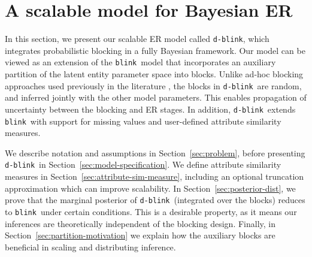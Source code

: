 \documentclass[12pt,letterpaper]{article}
\newcommand{\1}[1]{\mathbb{I}\!\left[#1\right]} %
\newcommand{\dblink}{\texttt{\upshape \lowercase{d-blink}}} %
\newcommand{\blink}{\texttt{\upshape \lowercase{blink}}} %
\begin{document}
\section{A scalable model for Bayesian ER}
\label{sec:model}

In this section, we present our scalable ER model called \dblink, 
which integrates probabilistic blocking in a fully Bayesian framework.
Our model can be viewed as an extension of the \blink\ model 
\citep{steorts_entity_2015} that incorporates an auxiliary partition 
of the latent entity parameter space into blocks. 
Unlike ad-hoc blocking approaches used previously in the literature 
\citep{larsen_advances_2005, larsen_experiment_2012, 
  tancredi_hierarchical_2011, gutman_bayesian_2013, sadinle_detecting_2014, 
  steorts_bayesian_2016}, 
the blocks in \dblink\ are random, and inferred jointly with the other 
model parameters. 
This enables propagation of uncertainty between the blocking and ER stages.
In addition, \dblink\ extends \blink\ with support for missing values and 
user-defined attribute similarity measures.

We describe notation and assumptions in Section~\ref{sec:problem}, before 
presenting \dblink\ in Section~\ref{sec:model-specification}.
We define attribute similarity measures in 
Section~\ref{sec:attribute-sim-measure}, including an optional truncation 
approximation which can improve scalability.
In Section~\ref{sec:posterior-dist}, we prove that the marginal posterior of  
\dblink\ (integrated over the blocks) reduces to \blink\ under certain 
conditions.
This is a desirable property, as it means our inferences are theoretically 
independent of the blocking design. 
Finally, in Section~\ref{sec:partition-motivation} we explain how the auxiliary 
blocks are beneficial in scaling and distributing inference.
\end{document}
